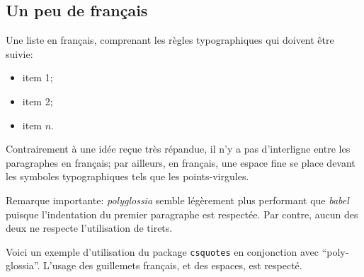 \documentclass[11pt, a4paper, english]{article}
\begin{document}
	
	\begin{french}%
		
		\subsection{Un peu de français}
		
			Une liste en français, comprenant les règles typographiques qui doivent être suivie:
			\begin{itemize}
				\item item 1;
				\item item 2;
				\item item $n$.
			\end{itemize}
			
			Contrairement à une idée reçue très répandue, il n'y a pas d'interligne entre les paragraphes en français; par ailleurs, en français, une espace fine se place devant les symboles typographiques tels que les points-virgules.
			
			Remarque importante: \textit{polyglossia} semble légèrement plus performant que \textit{babel} puisque l'indentation du premier paragraphe est respectée. Par contre, aucun des deux ne respecte l'utilisation de tirets.
			
			Voici un exemple d'utilisation du package \texttt{csquotes} en conjonction avec \enquote{polyglossia}. L'usage des guillemets français, et des espaces, est respecté.
	\end{french}
\end{document}
